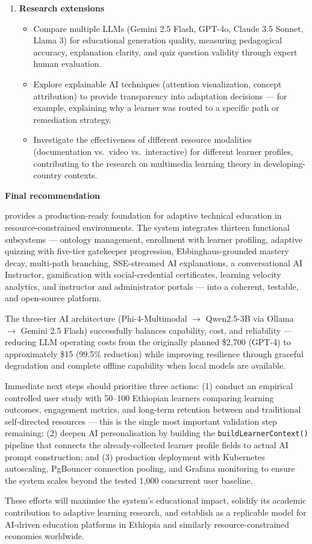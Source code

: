 \begin{enumerate}
    \item \textbf{Research extensions}
        \begin{itemize}
            \item Compare multiple LLMs (Gemini 2.5 Flash, GPT-4o, Claude 3.5 Sonnet, Llama 3) for educational generation quality, measuring pedagogical accuracy, explanation clarity, and quiz question validity through expert human evaluation.
            \item Explore explainable AI techniques (attention visualization, concept attribution) to provide transparency into adaptation decisions --- for example, explaining why a learner was routed to a specific path or remediation strategy.
            \item Investigate the effectiveness of different resource modalities (documentation vs.\ video vs.\ interactive) for different learner profiles, contributing to the research on multimedia learning theory in developing-country contexts.
        \end{itemize}
\end{enumerate}

\textbf{Final recommendation}

\projectname{} provides a production-ready foundation for adaptive technical education in resource-constrained environments. The system integrates thirteen functional subsystems --- ontology management, enrollment with learner profiling, adaptive quizzing with five-tier gatekeeper progression, Ebbinghaus-grounded mastery decay, multi-path branching, SSE-streamed AI explanations, a conversational AI Instructor, gamification with social-credential certificates, learning velocity analytics, and instructor and administrator portals --- into a coherent, testable, and open-source platform.

The three-tier AI architecture (Phi-4-Multimodal $\rightarrow$ Qwen2.5-3B via Ollama $\rightarrow$ Gemini 2.5 Flash) successfully balances capability, cost, and reliability --- reducing LLM operating costs from the originally planned \$2,700 (GPT-4) to approximately \$15 (99.5\% reduction) while improving resilience through graceful degradation and complete offline capability when local models are available.

Immediate next steps should prioritise three actions: (1) conduct an empirical controlled user study with 50--100 Ethiopian learners comparing learning outcomes, engagement metrics, and long-term retention between \projectname{} and traditional self-directed resources --- this is the single most important validation step remaining; (2) deepen AI personalisation by building the \texttt{buildLearnerContext()} pipeline that connects the already-collected learner profile fields to actual AI prompt construction; and (3) production deployment with Kubernetes autoscaling, PgBouncer connection pooling, and Grafana monitoring to ensure the system scales beyond the tested 1,000 concurrent user baseline.

These efforts will maximise the system's educational impact, solidify its academic contribution to adaptive learning research, and establish \projectname{} as a replicable model for AI-driven education platforms in Ethiopia and similarly resource-constrained economies worldwide.

\endinput
